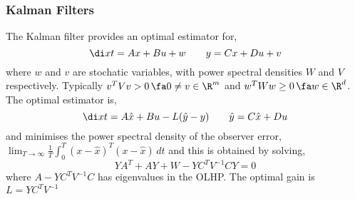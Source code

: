 \subsubsection{Kalman Filters}

The Kalman filter provides an optimal estimator for,
$$ \di x t = Ax + Bu + w \qquad y = Cx + Du + v$$
where $w$ and $v$ are stochatic variables, with power spectral densities $W$ and $V$ respectively. Typically $v^TVv > 0 \, \fa 0 \ne v \in \R^m$ and $w^TWw \ge 0 \,\fa w \in \R^d$. The optimal estimator is,
$$ \di x t = A\hat x + Bu - L(\hat y - y) \qquad \hat y = C\hat x + Du $$
and minimises the power spectral density of the observer error, $\lim_{T\to\infty} \frac{1}{T}\int_0^T (x - \hat x)^T(x - \hat x)\,dt$ and this is obtained by solving,
$$ YA^T +AY+W-YC^TV^{-1}CY = 0 $$
where $A - YC^TV^{-1}C$ has eigenvalues in the OLHP. The optimal gain is $L = YC^TV^{-1}$
